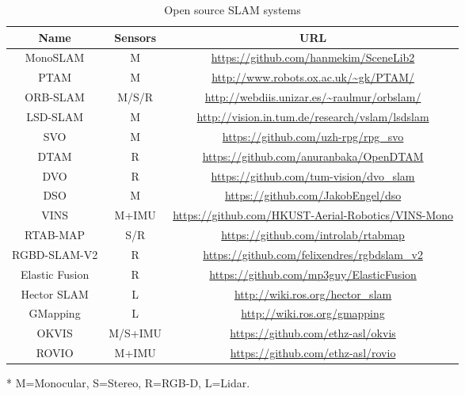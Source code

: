 \begin{table}[!h]
	\small
	\caption{Open source SLAM systems}
	\label{table:opensource-slam}
	\begin{threeparttable}
	\begin{tabular}{c|c|c}%
		\hline\hline
		Name & Sensors\tnote{*} & URL \\
		\hline
		MonoSLAM &  M & \url{https://github.com/hanmekim/SceneLib2}  \\ 
		PTAM & M & \url{http://www.robots.ox.ac.uk/~gk/PTAM/} \\ 
		ORB-SLAM & M/S/R & \url{http://webdiis.unizar.es/~raulmur/orbslam/} \\ 
		LSD-SLAM & M & \url{http://vision.in.tum.de/research/vslam/lsdslam} \\
		SVO & M & \url{https://github.com/uzh-rpg/rpg_svo} \\ 
		DTAM & R & \url{https://github.com/anuranbaka/OpenDTAM} \\ 
		DVO & R & \url{https://github.com/tum-vision/dvo_slam} \\ 
		DSO & M & \url{https://github.com/JakobEngel/dso} \\
		VINS & M+IMU & \url{https://github.com/HKUST-Aerial-Robotics/VINS-Mono} \\
		RTAB-MAP & S/R & \url{https://github.com/introlab/rtabmap} \\ 
		RGBD-SLAM-V2 & R & \url{https://github.com/felixendres/rgbdslam_v2} \\ 
		Elastic Fusion & R & \url{https://github.com/mp3guy/ElasticFusion} \\ 
		Hector SLAM & L & \url{http://wiki.ros.org/hector_slam} \\ 
		GMapping & L & \url{http://wiki.ros.org/gmapping} \\ 
		OKVIS & M/S+IMU & \url{https://github.com/ethz-asl/okvis} \\ 
		ROVIO & M+IMU & \url{https://github.com/ethz-asl/rovio} \\ 
		\hline\hline
	\end{tabular}

	\begin{tablenotes}
		\footnotesize
		\item [*] M=Monocular, S=Stereo, R=RGB-D, L=Lidar.
	\end{tablenotes}
	\end{threeparttable}
\end{table}

